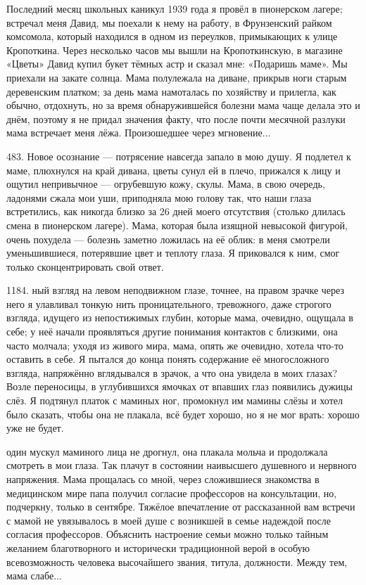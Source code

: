 Последний месяц школьных каникул 1939 года я провёл в пионерском лагере; встречал меня Давид, мы поехали к нему на работу, в Фрунзенский райком комсомола, который находился в одном из переулков, примыкающих к улице Кропоткина. Через несколько часов мы вышли на Кропоткинскую, в магазине «Цветы» Давид купил букет тёмных астр и сказал мне: «Подаришь маме». Мы приехали на закате солнца. Мама полулежала на диване, прикрыв ноги старым деревенским платком; за день мама намоталась по хозяйству и прилегла, как обычно, отдохнуть, но за время обнаружившейся болезни мама чаще делала это и днём, поэтому я не придал значения факту, что после почти месячной разлуки мама встречает меня лёжа. Произошедшее через мгновение...

483.
Новое осознание — потрясение навсегда запало в мою душу.
Я подлетел к маме, плюхнулся на край дивана, цветы сунул ей в плечо, прижался к лицу и ощутил непривычное — огрубевшую кожу, скулы. Мама, в свою очередь, ладонями сжала мои уши, приподняла мою голову так, что наши глаза встретились, как никогда близко за 26 дней моего отсутствия (столько длилась смена в пионерском лагере). Мама, которая была изящной невысокой фигурой, очень похудела — болезнь заметно ложилась на её облик: в меня смотрели уменьшившиеся, потерявшие цвет и теплоту глаза. Я приковался к ним, смог только сконцентрировать свой ответ.

1184. ный взгляд на левом неподвижном глазе, точнее, на правом зрачке через него я улавливал тонкую нить проницательного, тревожного, даже строгого взгляда, идущего из непостижимых глубин, которые мама, очевидно, ощущала в себе; у неё начали проявляться другие понимания контактов с близкими, она часто молчала; уходя из живого мира, мама, опять же очевидно, хотела что-то оставить в себе. Я пытался до конца понять содержание её многосложного взгляда, напряжённо вглядывался в зрачок, а что она увидела в моих глазах? Возле переносицы, в углубившихся ямочках от впавших глаз появились дужицы слёз. Я подтянул платок с маминых ног, промокнул им мамины слёзы и хотел было сказать, чтобы она не плакала, всё будет хорошо, но я не мог врать: хорошо уже не будет.

один мускул маминого лица не дрогнул, она плакала мольча и продолжала смотреть в мои глаза. Так плачут в состоянии наивысшего душевного и нервного напряжения. Мама прощалась со мной, через сложившиеся знакомства в медицинском мире папа получил согласие профессоров на консультации, но, подчеркну, только в сентябре. Тяжёлое впечатление от рассказанной вам встречи с мамой не увязывалось в моей душе с возникшей в семье надеждой после согласия профессоров. Объяснить настроение семьи можно только тайным желанием благотворного и исторически традиционной верой в особую всевозможность человека высочайшего звания, титула, должности. Между тем, мама слабе...

